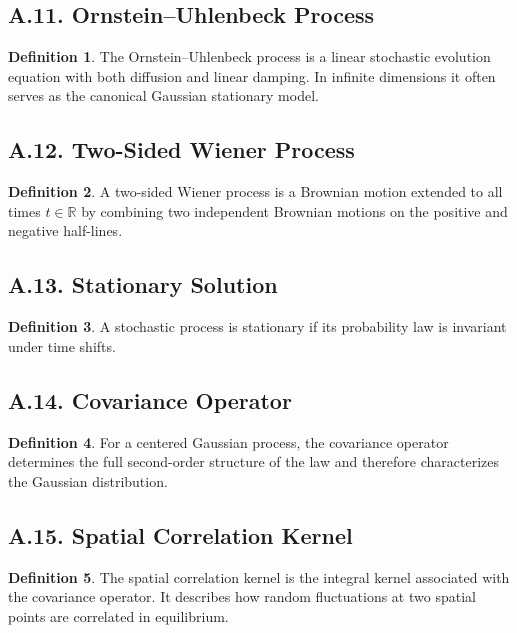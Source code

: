 \documentclass[11pt]{article}
\theoremstyle{definition}
\newtheorem{definition}{Definition}
\theoremstyle{remark}
\begin{document}
\subsection*{A.11. Ornstein--Uhlenbeck Process}
\begin{definition}
The Ornstein--Uhlenbeck process is a linear stochastic evolution equation with both diffusion and linear damping. In infinite dimensions it often serves as the canonical Gaussian stationary model.
\end{definition}

\subsection*{A.12. Two-Sided Wiener Process}
\begin{definition}
A two-sided Wiener process is a Brownian motion extended to all times \(t\in\mathbb R\) by combining two independent Brownian motions on the positive and negative half-lines.
\end{definition}

\subsection*{A.13. Stationary Solution}
\begin{definition}
A stochastic process is stationary if its probability law is invariant under time shifts.
\end{definition}

\subsection*{A.14. Covariance Operator}
\begin{definition}
For a centered Gaussian process, the covariance operator determines the full second-order structure of the law and therefore characterizes the Gaussian distribution.
\end{definition}

\subsection*{A.15. Spatial Correlation Kernel}
\begin{definition}
The spatial correlation kernel is the integral kernel associated with the covariance operator. It describes how random fluctuations at two spatial points are correlated in equilibrium.
\end{definition}
\end{document}
